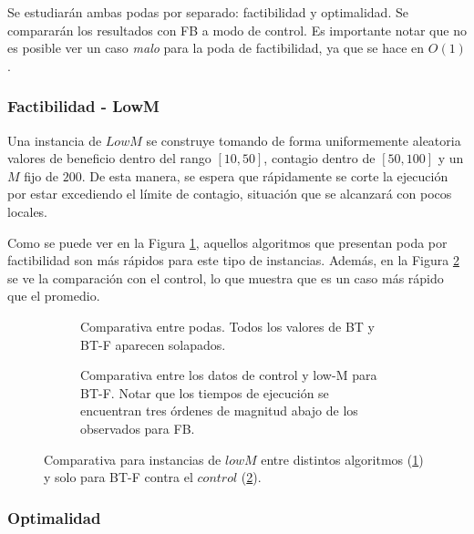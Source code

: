 Se estudiarán ambas podas por separado: factibilidad y optimalidad. Se compararán los resultados con FB a modo de control. Es importante notar que no es posible ver un caso \textit{malo} para la poda de factibilidad, ya que se hace en $O(1)$.

\subsubsection{Factibilidad - LowM}

Una instancia de $LowM$ se construye tomando de forma uniformemente aleatoria valores de beneficio dentro del rango $[10,50]$, contagio dentro de $[50,100]$ y un $M$ fijo de $200$. De esta manera, se espera que rápidamente se corte la ejecución por estar excediendo el límite de contagio, situación que se alcanzará con pocos locales.

Como se puede ver en la Figura \ref{fig:low-m-comp}, aquellos algoritmos que presentan poda por factibilidad son más rápidos para este tipo de instancias. Además, en la Figura \ref{fig:low-m-control} se ve la comparación con el control, lo que muestra que es un caso más rápido que el promedio.

\begin{figure}[H]
    \centering
    \begin{subfigure}[b]{0.45\textwidth}
        \centering
        
        \caption{Comparativa entre podas. Todos los valores de BT y BT-F aparecen solapados.}
        \label{fig:low-m-comp}
    \end{subfigure}
    \begin{subfigure}[b]{0.45\textwidth}
        \centering
        
        \caption{Comparativa entre los datos de control y low-M para BT-F. Notar que los tiempos de ejecución se encuentran tres órdenes de magnitud abajo de los observados para FB.}
        \label{fig:low-m-control}
    \end{subfigure}
    \caption{Comparativa para instancias de $lowM$ entre distintos algoritmos (\ref{fig:low-m-comp}) y solo para BT-F contra el $control$ (\ref{fig:low-m-control}).}
    \label{fig:low-m}
\end{figure}



\subsubsection{Optimalidad}

